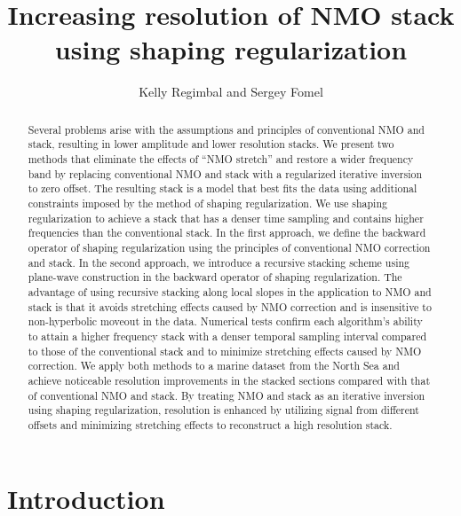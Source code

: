 \title{Increasing resolution of NMO stack using shaping regularization}
\author{Kelly Regimbal and Sergey Fomel}


\maketitle

\begin{abstract}
Several problems arise with the assumptions and principles of
conventional NMO and stack, resulting in lower amplitude and lower resolution stacks. We present two methods 
that eliminate the effects of ``NMO stretch'' and restore a wider frequency band by replacing conventional 
NMO and stack with a regularized iterative inversion to zero offset. The resulting stack is a model that 
best fits the data using additional constraints imposed by the method of shaping 
regularization. We use shaping regularization to achieve a 
stack that has a denser time sampling and contains higher frequencies than the conventional 
stack. In the first approach, we define the backward operator of shaping regularization
using the principles of conventional NMO correction and stack. In the second approach, we introduce a recursive 
stacking scheme using plane-wave construction in the backward operator of shaping regularization. The advantage of 
using recursive stacking along local 
slopes in the application to NMO and stack is that it avoids stretching effects caused by NMO correction and is insensitive to non-hyperbolic moveout in the data. Numerical tests confirm each algorithm's ability to attain a higher frequency stack with a denser temporal sampling interval compared to those of the conventional stack and to minimize stretching effects caused by NMO correction. We apply both methods to a marine dataset from the North Sea and achieve noticeable resolution improvements in the stacked sections compared with that of conventional NMO and stack. By treating NMO and stack
as an iterative inversion using shaping regularization, resolution is enhanced by utilizing signal from different offsets and
minimizing stretching effects to reconstruct a high resolution stack.
\end{abstract}

\section{Introduction}


